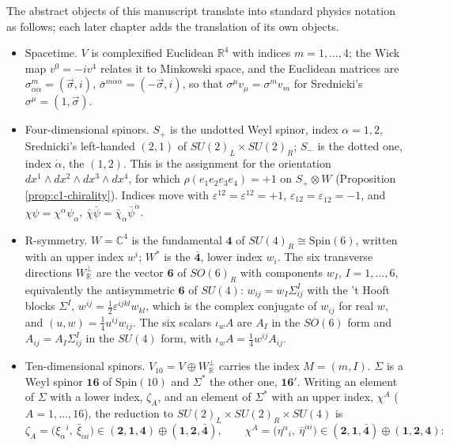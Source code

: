 \begin{remark}
The abstract objects of this manuscript translate into standard physics notation as follows; each later chapter adds the translation of its own objects.
\begin{itemize}
\item Spacetime. $V$ is complexified Euclidean $\mathbb R^4$ with indices $m=1,\dots,4$; the Wick map $v^0=-iv^4$ relates it to Minkowski space, and the Euclidean matrices are $\sigma^m_{\alpha\dot\alpha}=(\vec\sigma,i)$, $\bar\sigma^{m\dot\alpha\alpha}=(-\vec\sigma,i)$, so that $\sigma^\mu v_\mu=\sigma^mv_m$ for Srednicki's $\sigma^\mu=(1,\vec\sigma)$.
\item Four-dimensional spinors. $S_+$ is the undotted Weyl spinor, index $\alpha=1,2$, Srednicki's left-handed $(2,1)$ of $SU(2)_L\times SU(2)_R$; $S_-$ is the dotted one, index $\dot\alpha$, the $(1,2)$. This is the assignment for the orientation $dx^1\wedge dx^2\wedge dx^3\wedge dx^4$, for which $\rho(e_1e_2e_3e_4)=+1$ on $S_+\otimes W$ (Proposition \ref{prop:c1-chirality}). Indices move with $\varepsilon^{12}=\varepsilon^{\dot1\dot2}=+1$, $\varepsilon_{12}=\varepsilon_{\dot1\dot2}=-1$, and $\chi\psi=\chi^\alpha\psi_\alpha$, $\bar\chi\bar\psi=\bar\chi_{\dot\alpha}\bar\psi^{\dot\alpha}$.
\item R-symmetry. $W=\mathbb C^4$ is the fundamental $\mathbf 4$ of $SU(4)_R\cong\mathrm{Spin}(6)$, written with an upper index $w^i$; $W^*$ is the $\bar{\mathbf 4}$, lower index $w_i$. The six transverse directions $W_{\mathbb R}^\perp$ are the vector $\mathbf 6$ of $SO(6)_R$ with components $w_I$, $I=1,\dots,6$, equivalently the antisymmetric $\mathbf 6$ of $SU(4)$: $w_{ij}=w_I\Sigma^I_{ij}$ with the 't Hooft blocks $\Sigma^I$, $w^{ij}=\tfrac12\varepsilon^{ijkl}w_{kl}$, which is the complex conjugate of $w_{ij}$ for real $w$, and $(u,w)=\tfrac14u^{ij}w_{ij}$. The six scalars $\iota_wA$ are $A_I$ in the $SO(6)$ form and $A_{ij}=A_I\Sigma^I_{ij}$ in the $SU(4)$ form, with $\iota_wA=\tfrac14w^{ij}A_{ij}$.
\item Ten-dimensional spinors. $V_{10}=V\oplus W_{\mathbb R}^\perp$ carries the index $M=(m,I)$. $\Sigma$ is a Weyl spinor $\mathbf{16}$ of $\mathrm{Spin}(10)$ and $\Sigma^*$ the other one, $\mathbf{16}'$. Writing an element of $\Sigma$ with a lower index, $\zeta_A$, and an element of $\Sigma^*$ with an upper index, $\chi^A$ ($A=1,\dots,16$), the reduction to $SU(2)_L\times SU(2)_R\times SU(4)$ is
\[
\zeta_A=\big(\xi_\alpha{}^i,\ \bar\xi_{\dot\alpha i}\big)\in(\mathbf 2,\mathbf 1,\mathbf 4)\oplus(\mathbf 1,\mathbf 2,\bar{\mathbf 4}),\qquad \chi^A=\big(\eta^\alpha{}_i,\ \bar\eta^{\dot\alpha i}\big)\in(\mathbf 2,\mathbf 1,\bar{\mathbf 4})\oplus(\mathbf 1,\mathbf 2,\mathbf 4):
\]
\end{itemize}
\end{remark}
